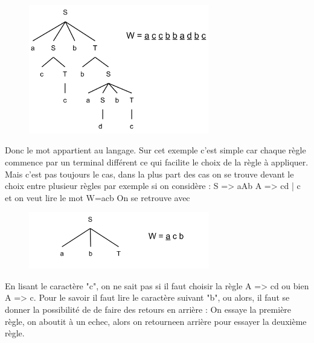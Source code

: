 \documentclass{article}
\begin{document}
\begin{figure}[h]
	\centering
		\includegraphics[width=0.70\textwidth]{AnalyseDescendante3.png}
	\label{fig:AnalyseDescendante3}
\end{figure}\FloatBarrier

Donc le mot appartient au langage. Sur cet exemple c'est simple car chaque règle commence par un terminal différent ce qui facilite le choix de la règle à appliquer. Mais c'est pas toujours le cas, dans la plus part des cas on se trouve devant le choix entre plusieur règles par exemple si on considère :\newline
S => aAb\newline
A => cd | c \newline
et on veut lire le mot W=acb\newline
On se retrouve avec

\begin{figure}[h]
	\centering
		\includegraphics[width=0.70\textwidth]{AnalyseDescendante4.png}
	\label{fig:AnalyseDescendante4}
\end{figure}\FloatBarrier

En lisant le caractère "c", on ne sait pas si il faut choisir la règle A => cd ou bien A => c.
Pour le savoir il faut lire le caractère suivant "b", ou alors, il faut se donner la possibilité de de faire des retours en arrière :
On essaye la première règle, on aboutit à un echec, alors on retourneen arrière pour essayer la deuxième règle.
\end{document}
